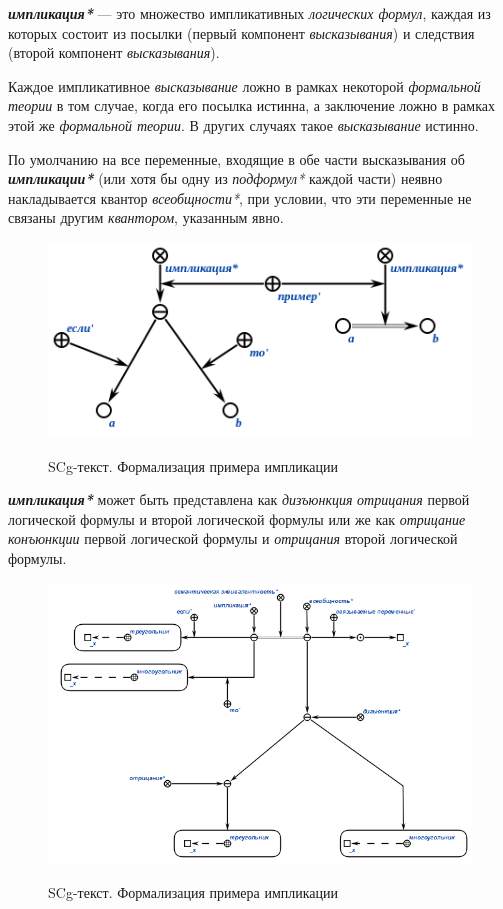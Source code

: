 \textbf{\textit{импликация*}} --- это множество импликативных \textit{логических формул}, каждая из которых состоит из посылки (первый компонент \textit{высказывания}) и следствия (второй компонент \textit{высказывания}).

Каждое импликативное \textit{высказывание} ложно в рамках некоторой \textit{формальной теории} в том случае, когда его посылка истинна, а заключение ложно в рамках этой же \textit{формальной теории}. В других случаях такое \textit{высказывание} истинно.

По умолчанию на все переменные, входящие в обе части высказывания об \textbf{\textit{импликации*}} (или хотя бы одну из \textit{подформул*} каждой части) неявно накладывается квантор \textit{всеобщности*}, при условии, что эти переменные не связаны другим \textit{квантором}, указанным явно.

\begin{figure}[H]
\caption{SCg-текст. Формализация примера импликации}
\includegraphics[scale=0.8]{author/part2/figures/logic/implication.png}
\label{fig:implication}
\end{figure}

\textbf{\textit{импликация*}} может быть представлена как \textit{дизъюнкция} \textit{отрицания} первой логической формулы и второй логической формулы или же как \textit{отрицание} \textit{конъюнкции} первой логической формулы и \textit{отрицания} второй логической формулы.

\begin{figure}[H]
	\caption{SCg-текст. Формализация примера импликации}
	\includegraphics[scale=0.8]{author/part2/figures/logic/implication_representation.png}
	\label{fig:implication_representation}
\end{figure}

